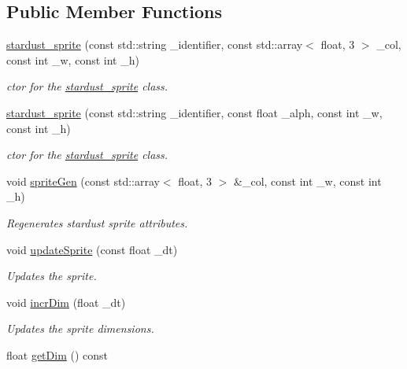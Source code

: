 \subsection*{Public Member Functions}
\begin{DoxyCompactItemize}
\item 
\hyperlink{classstardust__sprite_ab931e35702a0d009841a34586a11c8e9}{stardust\-\_\-sprite} (const std\-::string \-\_\-identifier, const std\-::array$<$ float, 3 $>$ \-\_\-col, const int \-\_\-w, const int \-\_\-h)
\begin{DoxyCompactList}\small\item\em ctor for the \hyperlink{classstardust__sprite}{stardust\-\_\-sprite} class. \end{DoxyCompactList}\item 
\hyperlink{classstardust__sprite_ad89c28faf9b6428504d8f795404f8906}{stardust\-\_\-sprite} (const std\-::string \-\_\-identifier, const float \-\_\-alph, const int \-\_\-w, const int \-\_\-h)
\begin{DoxyCompactList}\small\item\em ctor for the \hyperlink{classstardust__sprite}{stardust\-\_\-sprite} class. \end{DoxyCompactList}\item 
void \hyperlink{classstardust__sprite_af6e688ac14b830357b947952a6bd402e}{sprite\-Gen} (const std\-::array$<$ float, 3 $>$ \&\-\_\-col, const int \-\_\-w, const int \-\_\-h)
\begin{DoxyCompactList}\small\item\em Regenerates stardust sprite attributes. \end{DoxyCompactList}\item 
void \hyperlink{classstardust__sprite_a1b146645cfd0dce69e7053312212e71d}{update\-Sprite} (const float \-\_\-dt)
\begin{DoxyCompactList}\small\item\em Updates the sprite. \end{DoxyCompactList}\item 
void \hyperlink{classstardust__sprite_a7841c172e26158cd108dc48a0ebda755}{incr\-Dim} (float \-\_\-dt)
\begin{DoxyCompactList}\small\item\em Updates the sprite dimensions. \end{DoxyCompactList}\item 
\hypertarget{classstardust__sprite_a3a41460abf840fe0f1b5b9ebacc1df1d}{float \hyperlink{classstardust__sprite_a3a41460abf840fe0f1b5b9ebacc1df1d}{get\-Dim} () const }\label{classstardust__sprite_a3a41460abf840fe0f1b5b9ebacc1df1d}


\end{DoxyCompactItemize}
